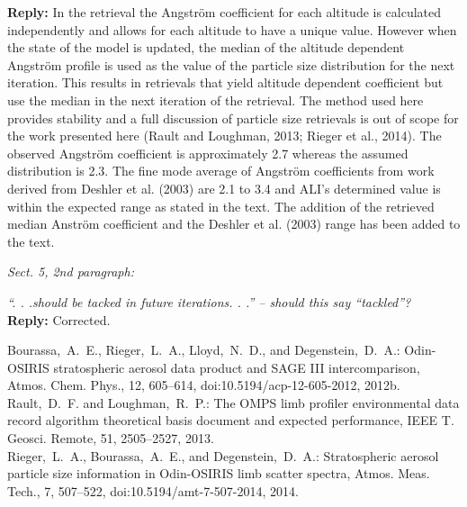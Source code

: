 \documentclass[12pt, notitlepage]{article}
\begin{document}
\textbf{Reply:} In the retrieval the Angstr\"{o}m coefficient for each altitude is calculated independently and allows for each altitude to have a unique value. However when the state of the model is updated, the median of the altitude dependent Angstr\"{o}m profile is used as the value of the particle size distribution for the next iteration. This results in retrievals that yield altitude dependent coefficient but use the median in the next iteration of the retrieval. The method used here provides stability and a full discussion of particle size retrievals is out of scope for the work presented here (Rault and Loughman, 2013; Rieger et al., 2014). The observed Angstr\"{o}m coefficient is approximately 2.7 whereas the assumed distribution is 2.3. The fine mode average of Angstr\"{o}m coefficients from work derived from Deshler et al. (2003) are 2.1 to 3.4 and ALI's determined value is within the expected range as stated in the text. The addition of the retrieved median Anstr\"{o}m coefficient and the Deshler et al. (2003) range has been added to the text.

\hrulefill

\textit{Sect. 5, 2nd paragraph:}

\textit{``. . .should be tacked in future iterations. . .'' – should this say ``tackled''?}\\

\textbf{Reply:} Corrected.

\hrulefill

Bourassa,~A.~E., Rieger,~L.~A., Lloyd,~N.~D., and Degenstein,~D.~A.:
Odin-OSIRIS stratospheric aerosol data product and SAGE III intercomparison,
Atmos. Chem. Phys., 12, 605--614,
doi:10.5194/acp-12-605-2012,
2012b.\\

Rault,~D.~F. and Loughman,~R.~P.: The OMPS limb profiler environmental data
record algorithm theoretical basis document and expected performance, IEEE T.
Geosci. Remote, 51, 2505--2527, 2013.\\

Rieger,~L.~A., Bourassa,~A.~E., and Degenstein,~D.~A.: Stratospheric aerosol
particle size information in Odin-OSIRIS limb scatter spectra, Atmos. Meas.
Tech., 7, 507--522,
doi:10.5194/amt-7-507-2014,
2014.\\
\end{document}
